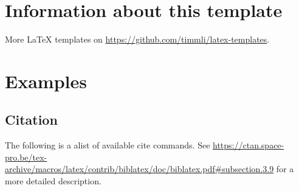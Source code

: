 \chapter{Information about this template}

More \LaTeX{} templates on \url{https://github.com/timmli/latex-templates}.

\chapter{Examples}

\section{Citation}

The following is a alist of available cite commands. See \url{https://ctan.space-pro.be/tex-archive/macros/latex/contrib/biblatex/doc/biblatex.pdf#subsection.3.9} for a more detailed description.

